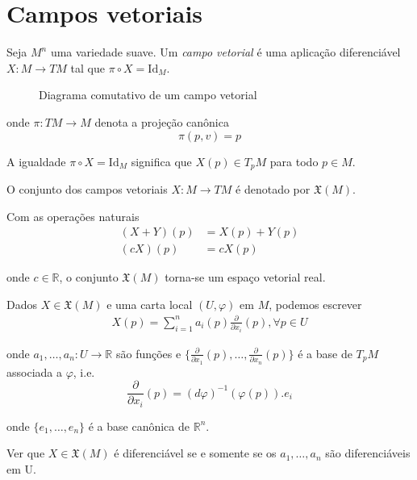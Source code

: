\section{Campos vetoriais}

\begin{defi}
	Seja $M^n$ uma variedade suave. Um \emph{campo vetorial} é uma aplicação diferenciável $X: M \rightarrow TM$ tal que $\pi \circ X = \text{Id}_M$.
	
\begin{figure}
	\centering
	\caption{Diagrama comutativo de um campo vetorial}
\end{figure}
	
	onde $\pi: TM \rightarrow M$ denota a projeção canônica
	\begin{equation*}
		\pi(p,v) = p
	\end{equation*}
\end{defi}

\begin{obse}
	A igualdade $\pi \circ X = \text{Id}_M$ significa que $X(p) \in T_p M$ para todo $p \in M$.
\end{obse}

\begin{nota}
	O conjunto dos campos vetoriais $X: M \rightarrow TM$ é denotado por $\mathfrak{X}(M)$.
\end{nota}

\begin{obse}
	Com as operações naturais
	\begin{align*}
		(X+Y)(p) &= X(p) + Y(p)\\
		(cX)(p) &= c X(p)
	\end{align*}
	
	onde $c \in \mathbb{R}$, o conjunto $\mathfrak{X}(M)$ torna-se um espaço vetorial real.
\end{obse}

\begin{obse}
	Dados $X \in \mathfrak{X}(M)$ e uma carta local $(U, \varphi)$ em $M$, podemos escrever
	\begin{align*}
		X(p) = \sum_{i=1}^n a_i (p) \frac{\partial}{\partial x_i} (p), \forall p \in U
	\end{align*}
	
	onde $a_1, \ldots, a_n: U \rightarrow \mathbb{R}$ são funções e $\{ \frac{\partial}{\partial x_1}(p), \ldots, \frac{\partial}{\partial x_n}(p) \}$ é a base de $T_p M$ associada a $\varphi$, i.e.
	\begin{equation*}
		\frac{\partial}{\partial x_i} (p) = (d \varphi)^{-1}(\varphi(p)).e_i
	\end{equation*}
	
	onde $\{ e_1, \ldots, e_n \}$ é a base canônica de $\mathbb{R}^n$.
\end{obse}

Ver que $X \in \mathfrak{X}(M)$ é diferenciável se e somente se os $a_1, \ldots, a_n$ são diferenciáveis em U.